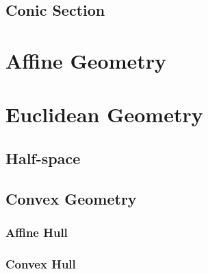 \subsection{Conic Section}\label{sec:conic_section}



\section{Affine Geometry}\label{sec:affine_geometry}

\section{Euclidean Geometry}\label{sec:euclidean_geometry}

\subsection{Half-space}\label{sec:half_space}

\subsection{Convex Geometry}\label{sec:convex_geometry}

\subsubsection{Affine Hull}\label{sec:affine_hull}

\subsubsection{Convex Hull}\label{sec:convex_hull}



